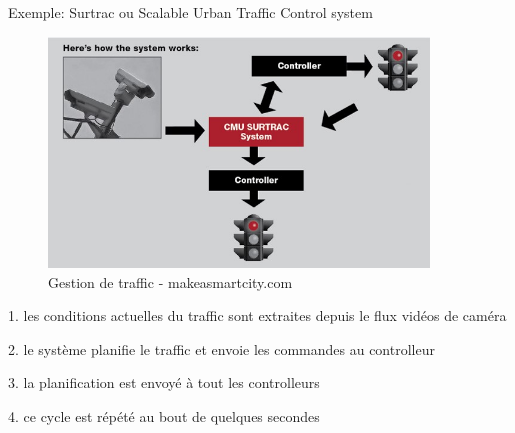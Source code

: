     Exemple: Surtrac ou Scalable Urban Traffic Control system

    \begin{figure}[H]
        \centering
        \includegraphics[width=0.9\textwidth]{Images/traffic}
        \caption{Gestion de traffic - makeasmartcity.com }
        \label{fig:trafficAI}
    \end{figure}
    
    1. les conditions actuelles du traffic sont extraites 
    depuis le flux vidéos de caméra 

    2. le système planifie le traffic et envoie les commandes au controlleur 

    3. la planification est envoyé à tout les controlleurs 

    4. ce cycle est répété au bout de quelques secondes 